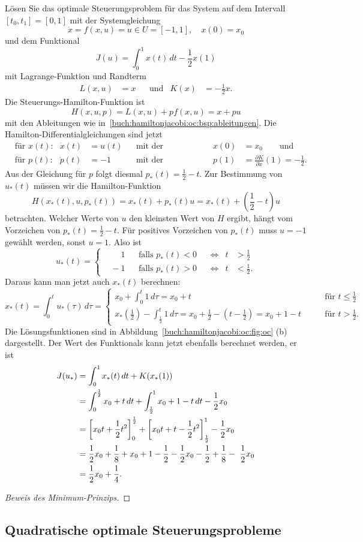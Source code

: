 \begin{beispiel}
\label{buch:hamiltonjacobi:oc:bsp:switch}
Lösen Sie das optimale Steuerungsproblem für das System auf dem Intervall
$[t_0,t_1]=[0,1]$ mit der Systemgleichung
\[
\dot{x} = f(x,u)=u\in U=[-1,1],\quad x(0) = x_0
\]
und dem Funktional
\[
J(u)
=
\int_0^1 x(t)\,dt -\frac12 x(1)
\]
mit Lagrange-Funktion und Randterm
\begin{align*}
L(x,u)
&=
x
&&\text{und}&
K(x)&=-\frac12x.
\end{align*}
Die Steuerungs-Hamilton-Funktion ist
\[
H(x,u,p)
=
L(x,u) + pf(x,u)
=
x + pu
\]
mit den Ableitungen wie in~\eqref{buch:hamiltonjacobi:oc:bsp:ableitungen}.
Die Hamilton-Differentialgleichungen sind jetzt
\begin{align*}
&\text{für $x(t)$:}&
\dot{x}(t)&=u(t)
&&\text{mit der Anfangsbedingung:}&
x(0)&=x_0\qquad\text{und}
\\
&\text{für $p(t)$:}&
\dot{p}(t)&=-1
&&\text{mit der Randbedingung:}&
p(1)&=\frac{\partial K}{\partial x}(1) = -\frac12.
\end{align*}
Aus der Gleichung für $p$ folgt diesmal $p_*(t)=\frac12-t$.
Zur Bestimmung von $u_*(t)$ müssen wir die Hamilton-Funktion
\[
H(x_*(t),u,p_*(t))
=
x_*(t)+p_*(t)u
=
x_*(t)+({\textstyle\frac12}-t)u
\]
betrachten.
Welcher Werte von $u$ den kleinsten Wert von $H$ ergibt, hängt
vom Vorzeichen von $p_*(t)=\frac12-t$.
Für positives Vorzeichen von $p_*(t)$ muss $u=-1$ gewählt werden,
sonst $u=1$.
Also ist
\[
u_*(t)
=
\left\{
\begin{aligned}
&\phantom{-}1&&\text{falls $p_*(t)<0$}&&\Leftrightarrow&t&>\textstyle\frac12
\\
&{}-1&&\text{falls $p_*(t)>0$}&&\Leftrightarrow&t&<\textstyle\frac12.
\end{aligned}
\right.
\]
Daraus kann man jetzt auch $x_*(t)$ berechnen:
\[
x_*(t)
=
\int_0^t u_*(\tau)\,d\tau
=
\begin{cases}
x_0+{\displaystyle\int_0^t 1\,d\tau} = x_0+t&\qquad\text{für $t\le\frac12$}
\\[8pt]
x_*(\frac12)-{\displaystyle\int_{\frac12}^t 1\,d\tau}
=
x_0+\frac12-(t-\frac12)
=
x_0+1-t&\qquad\text{für $t>\frac12$.}
\end{cases}
\]
Die Lösungsfunktionen sind in
Abbildung~\ref{buch:hamiltonjacobi:oc:fig:oc} (b)
dargestellt.
Der Wert des Funktionals kann jetzt ebenfalls berechnet werden, er ist
\begin{align*}
J(u_*)
&=
\int_0^1 x_*(t)\,dt + K(x_*(1))
\\
&=
\int_0^{\frac12} x_0+t \,dt
+
\int_{\frac12}^1 x_0+1-t\,dt
-
\frac12x_0
\\
&=
\biggl[x_0t+\frac12t^2\biggr]_0^{\frac12}
+
\biggl[x_0t+t-\frac12t^2\biggr]_{\frac12}^1 - \frac12x_0
\\
&=
\frac12x_0 + \frac18 + x_0+1-\frac12 - \frac12x_0-\frac12 +\frac18 - \frac12x_0
\\
&=\frac12x_0+\frac14.
\qedhere
\end{align*}
\end{beispiel}

\begin{proof}[Beweis des Minimum-Prinzips]
\end{proof}

%
%
\subsection{Quadratische optimale Steuerungsprobleme
\label{buch:hamiltonjacobi:oc:subsection:quadratisch}}
